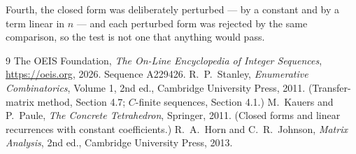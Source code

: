\documentclass[11pt,a4paper]{article}
\theoremstyle{plain}
\theoremstyle{definition}
\begin{document}
Fourth, the closed form was deliberately perturbed --- by a constant and by a term linear in
$n$ --- and each perturbed form was rejected by the same comparison, so the test is not one
that anything would pass.

\begin{thebibliography}{9}
 The OEIS Foundation, \emph{The On-Line Encyclopedia of Integer
Sequences}, \url{https://oeis.org}, 2026. Sequence A229426.
 R.~P.~Stanley, \emph{Enumerative Combinatorics}, Volume 1, 2nd ed.,
Cambridge University Press, 2011. (Transfer-matrix method, Section 4.7; $C$-finite sequences,
Section 4.1.)
 M.~Kauers and P.~Paule, \emph{The Concrete Tetrahedron}, Springer, 2011.
(Closed forms and linear recurrences with constant coefficients.)
 R.~A.~Horn and C.~R.~Johnson, \emph{Matrix Analysis}, 2nd ed., Cambridge
University Press, 2013.
\end{thebibliography}
\end{document}
